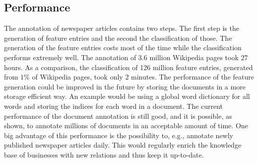 \subsection*{Performance}
The annotation of newspaper articles contains two steps. The first step is the generation of feature entries and the second the classification of those. The generation of the feature entries costs most of the time while the classification performs extremely well. The annotation of 3.6 million Wikipedia pages took 27 hours. As a comparison, the classification of 126 million feature entries, generated from $1\%$ of Wikipedia pages, took only 2 minutes. The performance of the feature generation could be improved in the future by storing the documents in a more storage efficient way. An example would be using a global word dictionary for all words and storing the indices for each word in a document. The current performance of the document annotation is still good, and it is possible, as shown, to annotate millions of documents in an acceptable amount of time. One big advantage of this performance is the possibility to, e.g., annotate newly published newspaper articles daily. This would regularly enrich the knowledge base of businesses with new relations and thus keep it up-to-date.\par
